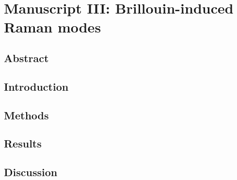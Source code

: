 \setcounter{rownumber}{0}
\singlespacing
\chapter{Manuscript III: Brillouin-induced Raman modes}
\label{ch:Raman}
\acresetall


%

%

\doublespacing


\section{Abstract}
\label{sec:Raman:Abstract}


\section{Introduction}
\label{sec:Raman:Introduction}


\section{Methods}
\label{sec:Raman:Methods}


\section{Results}
\label{sec:Raman:Results}


\section{Discussion}
\label{sec:Raman:Discussion}
